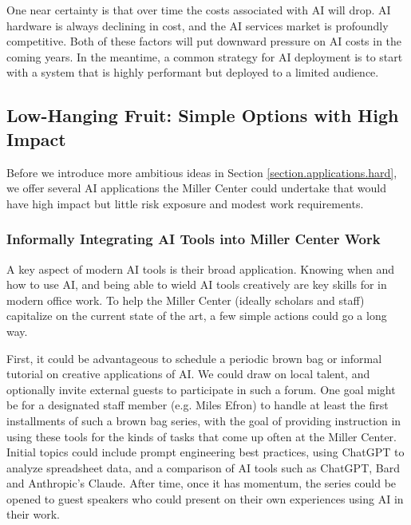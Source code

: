 \documentclass[12pt, oneside]{article}   	%
\begin{document}
One near certainty is that over time the costs associated with AI will drop.  AI hardware is always declining in cost, and the AI services market is profoundly competitive.  Both of these factors will put downward pressure on AI costs in the coming years.  In the meantime, a common strategy for AI deployment is to start with a system that is highly performant but deployed to a limited audience.  



\subsection{Low-Hanging Fruit: Simple Options with High Impact}\label{section.applications.easy}
Before we introduce more ambitious ideas in Section \ref{section.applications.hard}, we offer several AI applications the Miller Center could undertake that would have high impact but little risk exposure and modest work requirements.  

\subsubsection{Informally Integrating AI Tools into Miller Center Work}\label{section.application.easy.daily-work} 
A key aspect of modern AI tools is their broad application.  Knowing when and how to use AI, and being able to wield AI tools creatively are key skills for in modern office work.  To help the Miller Center (ideally scholars and staff) capitalize on the current state of the art, a few simple actions could go a long way.

First, it could be advantageous to schedule a periodic brown bag or informal tutorial on creative applications of AI.  We could draw on local talent, and optionally invite external guests to participate in such a forum.  One goal might be for a designated staff member (e.g. Miles Efron) to handle at least the first installments of such a brown bag series, with the goal of providing instruction in using these tools for the kinds of tasks that come up often at the Miller Center.  
 Initial topics could include prompt engineering best practices, using ChatGPT to analyze spreadsheet data, and a comparison of AI tools such as ChatGPT, Bard and Anthropic's Claude.  After time, once it has momentum, the series could be opened to guest speakers who could present on their own experiences using AI in their work.
\end{document}

